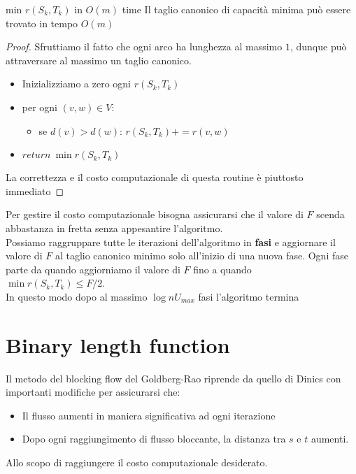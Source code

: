     \begin{lemma}{min $r(S_k,T_k)$ in $O(m)$ time}{}
        Il taglio canonico di capacità minima può essere trovato in tempo $O(m)$
    \end{lemma}
    \begin{proof}
        Sfruttiamo il fatto che ogni arco ha lunghezza al massimo $1$, dunque può attraversare al massimo un taglio canonico.
        \begin{itemize}[noitemsep]
            \item Inizializziamo a zero ogni $r(S_k,T_k)$
            \item per ogni $(v,w) \in V$:
            \begin{itemize}
                \item se $d(v) > d(w)$: $r(S_k,T_k) += r(v,w)$
            \end{itemize}
            \item $return\ \min r(S_k,T_k)$
        \end{itemize}
        La correttezza e il costo computazionale di questa routine è piuttosto immediato
    \end{proof}
    Per gestire il costo computazionale bisogna assicurarsi che il valore di $F$ scenda abbastanza in fretta senza appesantire l'algoritmo.\\
    Possiamo raggruppare tutte le iterazioni dell'algoritmo in \textbf{fasi} e aggiornare il valore di $F$ al taglio canonico minimo solo all'inizio di una nuova fase. 
    Ogni fase parte da quando aggiorniamo il valore di $F$ fino a quando\\$\min r(S_k,T_k)\le F/2$.\\
    In questo modo dopo al massimo $\log nU_{max}$ fasi l'algoritmo termina
\section{Binary length function}
    Il metodo del blocking flow del Goldberg-Rao riprende da quello di Dinics con importanti modifiche per assicurarsi che: 
    \begin{itemize}[nolistsep]
        \item Il flusso aumenti in maniera significativa ad ogni iterazione 
        \item Dopo ogni raggiungimento di flusso bloccante, la distanza tra $s$ e $t$ aumenti.
    \end{itemize} 
    Allo scopo di raggiungere il costo computazionale desiderato.

